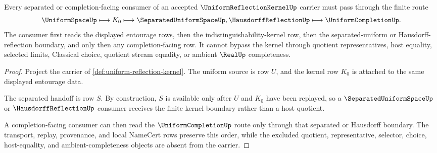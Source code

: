 \begin{theorem}
\label{thm:uniform-reflection-separated-handoff}
Every separated or completion-facing consumer of an accepted $\UniformReflectionKernelUp$ carrier must pass through the finite route
$$
\UniformSpaceUp \longmapsto K_0 \longmapsto \SeparatedUniformSpaceUp,\HausdorffReflectionUp \longmapsto \UniformCompletionUp .
$$
The consumer first reads the displayed entourage rows, then the indistinguishability-kernel row, then the separated-uniform or Hausdorff-reflection boundary, and only then any completion-facing row. It cannot bypass the kernel through quotient representatives, host equality, selected limits, Classical choice, quotient stream equality, or ambient $\RealUp$ completeness.
\end{theorem}
\begin{proof}
Project the carrier of \autoref{def:uniform-reflection-kernel}. The uniform source is row $U$, and the kernel row $K_0$ is attached to the same displayed entourage data.

The separated handoff is row $S$. By construction, $S$ is available only after $U$ and $K_0$ have been replayed, so a $\SeparatedUniformSpaceUp$ or $\HausdorffReflectionUp$ consumer receives the finite kernel boundary rather than a host quotient.

A completion-facing consumer can then read the $\UniformCompletionUp$ route only through that separated or Hausdorff boundary. The transport, replay, provenance, and local NameCert rows preserve this order, while the excluded quotient, representative, selector, choice, host-equality, and ambient-completeness objects are absent from the carrier.
\end{proof}


\begin{closurestatus}{\UniformReflectionKernelUp}
  \theoryclosure{\seedClosure}
  \formalstatus{\unformalizedV}
\end{closurestatus}
